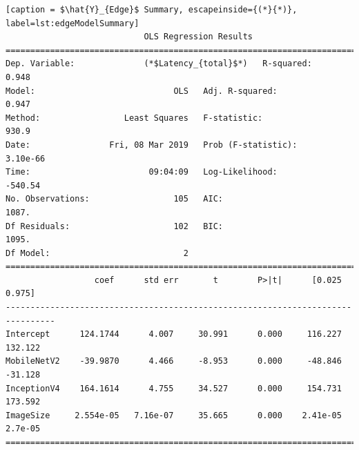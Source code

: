 \lstset{basicstyle=\scriptsize}
\begin{minipage}{\linewidth}
\begin{lstlisting}[caption = $\hat{Y}_{Edge}$ Summary, escapeinside={(*}{*)}, label=lst:edgeModelSummary]
                            OLS Regression Results                            
==============================================================================
Dep. Variable:              (*$Latency_{total}$*)   R-squared:                       0.948
Model:                            OLS   Adj. R-squared:                  0.947
Method:                 Least Squares   F-statistic:                     930.9
Date:                Fri, 08 Mar 2019   Prob (F-statistic):           3.10e-66
Time:                        09:04:09   Log-Likelihood:                -540.54
No. Observations:                 105   AIC:                             1087.
Df Residuals:                     102   BIC:                             1095.
Df Model:                           2                                         
================================================================================
                  coef      std err       t        P>|t|      [0.025      0.975]
--------------------------------------------------------------------------------
Intercept      124.1744      4.007     30.991      0.000     116.227     132.122
MobileNetV2    -39.9870      4.466     -8.953      0.000     -48.846     -31.128
InceptionV4    164.1614      4.755     34.527      0.000     154.731     173.592
ImageSize     2.554e-05   7.16e-07     35.665      0.000    2.41e-05     2.7e-05
================================================================================
\end{lstlisting}


\end{minipage}
